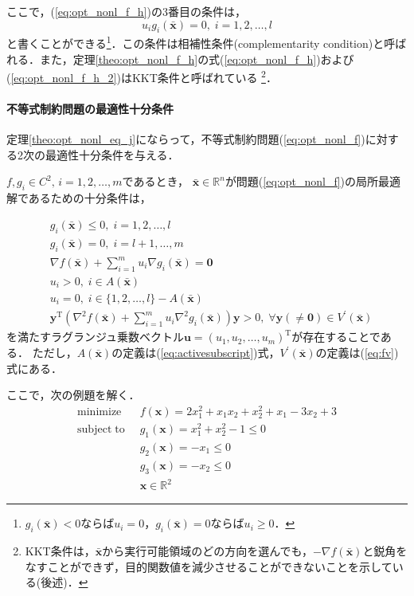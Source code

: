 \documentclass{jsreport}
\begin{document}
ここで，(\ref{eq:opt_nonl_f_h})の3番目の条件は，
\begin{equation}\label{eq:comp}
  u_i g_i(\bar{\bm{x}}) = 0, \; i = 1, 2, \ldots, l
\end{equation}
と書くことができる\footnote{$g_i(\bar{\bm{x}}) < 0$ならば$u_i = 0$，$g_i(\bar{\bm{x}}) = 0$ならば$u_i \geq 0$．}．この条件は相補性条件(complementarity condition)と呼ばれる．また，定理\ref{theo:opt_nonl_f_h}の式(\ref{eq:opt_nonl_f_h})および(\ref{eq:opt_nonl_f_h_2})はKKT条件と呼ばれている
\footnote{KKT条件は，$\bar{\bm{x}}$から実行可能領域のどの方向を選んでも，$-\nabla f(\bar{\bm{x}})$と鋭角をなすことができず，目的関数値を減少させることができないことを示している(後述)．}．

\paragraph{不等式制約問題の最適性十分条件}
定理\ref{theo:opt_nonl_eq_j}にならって，不等式制約問題(\ref{eq:opt_nonl_f})に対する2次の最適性十分条件を与える．
\begin{theo}\label{theo:opt_nonl_f_j}
  $f, g_i \in C^2, \, i = 1, 2, \ldots, m$であるとき，
  $\bar{\bm{x}} \in \mathbb{R}^n$が問題(\ref{eq:opt_nonl_f})の局所最適解であるための十分条件は，

  \begin{align}
    &g_i(\bar{\bm{x}}) \leq 0, \; i = 1, 2, \ldots, l \nonumber \\
    &g_i(\bar{\bm{x}}) = 0, \; i = l + 1, \ldots, m \nonumber \\
    &\nabla f(\bar{\bm{x}}) + \sum_{i = 1}^m u_i \nabla g_i(\bar{\bm{x}}) = \bm{0} \nonumber \\
    &u_i > 0, \; i \in A(\bar{\bm{x}}) \nonumber \\
    &u_i = 0, \; i \in \{1, 2, \ldots, l\} - A(\bar{\bm{x}}) \nonumber \\
    &\bm{y}^{\mathrm{T}} \left({\nabla}^2 f(\bar{\bm{x}}) + \sum_{i = 1}^m u_i {\nabla}^2 g_i(\bar{\bm{x}})\right) \bm{y} > 0, \; \forall \bm{y}(\neq \bm{0}) \in V^{\prime}(\bar{\bm{x}})
  \end{align}
  を満たすラグランジュ乗数ベクトル$\bm{u} = (u_1, u_2, \ldots, u_m)^{\mathrm{T}}$が存在することである．
  ただし，$A(\bar{\bm{x}})$の定義は(\ref{eq:activesubscript})式，$V^{\prime}(\bar{\bm{x}})$の定義は(\ref{eq:fv})式にある．
\end{theo}

ここで，次の例題を解く．
\begin{align}
  \mathrm{minimize} \; \; &f(\bm{x}) = 2x_1^2 + x_1 x_2 + x_2^2 + x_1 - 3x_2 + 3 \nonumber\\
  \mathrm{subject \; to} \; \; &g_1(\bm{x}) = x_1^2 + x_2^2 - 1 \leq 0 \nonumber \\
  &g_2(\bm{x}) = -x_1 \leq 0 \nonumber \\
  &g_3(\bm{x}) = -x_2 \leq 0 \nonumber \\
  &\bm{x} \in \mathbb{R}^2 \nonumber
\end{align}
\end{document}
